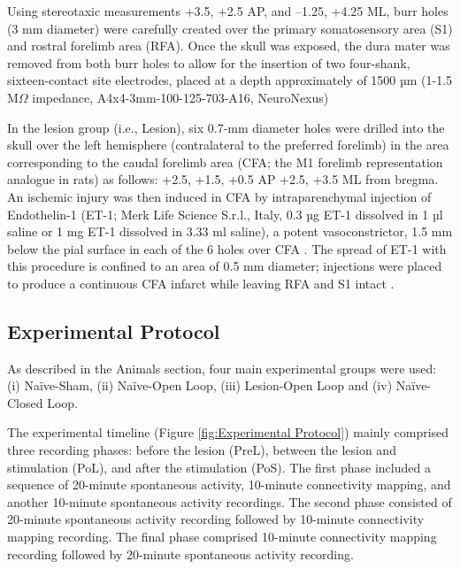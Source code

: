 Using stereotaxic measurements \cite{Kleim2003} +3.5, +2.5 AP, and –1.25, +4.25 ML, burr holes (3 mm diameter) were carefully created over the primary somatosensory area (S1) and rostral forelimb area (RFA). Once the skull was exposed, the dura mater was removed from both burr holes to allow for the insertion of two four-shank, sixteen-contact site electrodes, placed at a depth approximately of 1500 µm (1-1.5 M$\Omega$ impedance, A4x4-3mm-100-125-703-A16, NeuroNexus)

In the lesion group (i.e., Lesion), six 0.7-mm diameter holes were drilled into the skull over the left hemisphere (contralateral to the preferred forelimb) in the area corresponding to the caudal forelimb area (CFA; the M1 forelimb representation analogue in rats) as follows: +2.5, +1.5, +0.5 AP +2.5, +3.5 ML from bregma.
An ischemic injury was then induced in CFA by intraparenchymal injection of Endothelin-1 (ET-1; Merk Life Science S.r.l., Italy, 0.3 µg ET-1 dissolved in 1 µl saline or 1 mg ET-1 dissolved in 3.33 ml saline), a potent vasoconstrictor, 1.5 mm below the pial surface in each of the 6 holes over CFA \cite{Gilmour2005}. The spread of ET-1 with this procedure is confined to an area of 0.5 mm diameter; injections were placed to produce a continuous CFA infarct while leaving RFA and S1 intact \cite{Fang2010}.

\subsection{Experimental Protocol}

As described in the Animals section, four main experimental groups were used: (i) Naïve-Sham, (ii) Naïve-Open Loop, (iii) Lesion-Open Loop and (iv) Naïve-Closed Loop. 

The experimental timeline (Figure \ref{fig:Experimental Protocol}) mainly comprised three recording phases: before the lesion (PreL), between the lesion and stimulation (PoL), and after the stimulation (PoS). The first phase included a sequence of 20-minute spontaneous activity, 10-minute connectivity mapping, and another 10-minute spontaneous activity recordings. The second phase consisted of 20-minute spontaneous activity recording followed by 10-minute connectivity mapping recording. The final phase comprised 10-minute connectivity mapping recording followed by 20-minute spontaneous activity recording.

